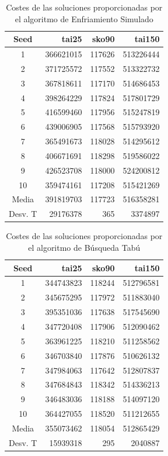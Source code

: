 \documentclass[runningheads,a4paper]{llncs}
\begin{document}
\begin{table}[H]
\centering
\caption{Costes de las soluciones proporcionadas por el algoritmo de Enfriamiento Simulado}

\begin{tabular}{c || r | r | r }
Seed & \qquad  tai25 \qquad \quad & \qquad sko90 \qquad & \qquad \qquad tai150 \qquad\\\hline 
1 	& 366621015 & 117626 & 513226444 \\
2	& 371725572 & 117552 & 513322732 \\
3	& 367818611 & 117170 & 514686453 \\
4	& 398264229 & 117824 & 517801729 \\
5	& 416599460 & 117956 & 515247819 \\
6	& 439006905 & 117568 & 515793920 \\
7	& 365491673 & 118028 & 514295612 \\
8	& 406671691 & 118298 & 519586022 \\
9	& 426523708 & 118000 & 524200812 \\
10	& 359474161 & 117208 & 515421269\\ \hline \hline
Media & 391819703 & 117723 & 516358281\\
Desv. T & 29176378 & 365 & 3374897\\
\end{tabular}
\end{table}

\begin{table}[H]
\centering
\caption{Costes de las soluciones proporcionadas por el algoritmo de Búsqueda Tabú}

\begin{tabular}{c || r | r | r }
Seed & \qquad  tai25 \qquad \quad & \qquad sko90 \qquad & \qquad \qquad tai150 \qquad\\\hline 
1 	& 344743823 & 118244 & 512796581 \\
2	& 345675295 & 117972 & 511883040 \\
3	& 395351036 & 117638 & 517545690 \\
4	& 347720408 & 117906 & 512090462 \\
5	& 363961225 & 118210 & 511258562 \\
6	& 346703840 & 117876 & 510626132 \\
7	& 347984063 & 117642 & 512807837 \\
8	& 347684843 & 118342 & 514336213 \\
9	& 346483036 & 118188 & 514097120 \\
10	& 364427055 & 118520 & 511212655\\ \hline \hline
Media & 355073462 & 118054 & 512865429  \\
Desv. T & 15939318 & 295 & 2040887 \\
\end{tabular}
\end{table}
\end{document}
